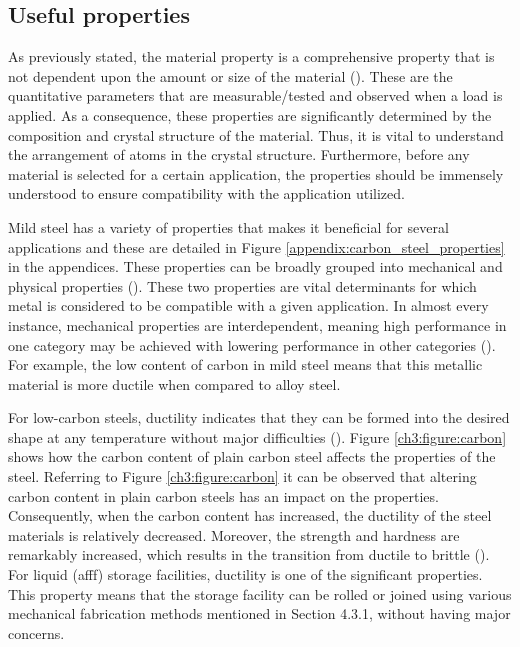 \subsection{Useful properties} 
As previously stated, the material property is a comprehensive property that is not dependent upon the amount or size of the material (\cite{kabir2020critical}). These are the quantitative parameters that are measurable/tested and observed when a load is applied. As a consequence, these properties are significantly determined by the composition and crystal structure of the material. Thus, it is vital to understand the arrangement of atoms in the crystal structure. Furthermore, before any material is selected for a certain application, the properties should be immensely understood to ensure compatibility with the application utilized.

Mild steel has a variety of properties that makes it beneficial for several applications and these are detailed in Figure \ref{appendix:carbon_steel_properties} in the appendices. These properties can be broadly grouped into mechanical and physical properties (\cite{kabir2020critical}). These two properties are vital determinants for which metal is considered to be compatible with a given application. In almost every instance, mechanical properties are interdependent, meaning high performance in one category may be achieved with lowering performance in other categories (\cite{kabir2020critical}). For example, the low content of carbon in mild steel means that this metallic material is more ductile when compared to alloy steel.

For low-carbon steels, ductility indicates that they can be formed into the desired shape at any temperature without major difficulties (\cite{dong2005deformation}). Figure \ref{ch3:figure:carbon} shows how the carbon content of plain carbon steel affects the properties of the steel. Referring to Figure \ref{ch3:figure:carbon} it can be observed that altering carbon content in plain carbon steels has an impact on the properties. Consequently, when the carbon content has increased, the ductility of the steel materials is relatively decreased. Moreover, the strength and hardness are remarkably increased, which results in the transition from ductile to brittle (\cite{abou2001mechanical}). For liquid (\acrshort{afff}) storage facilities, ductility is one of the significant properties. This property means that the storage facility can be rolled or joined using various mechanical fabrication methods mentioned in Section 4.3.1, without having major concerns.
 
